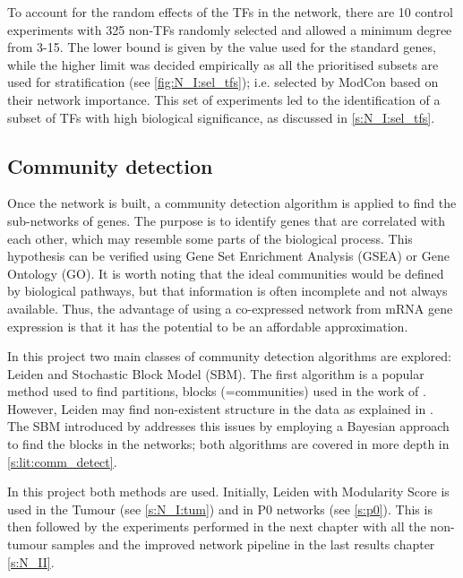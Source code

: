 To account for the random effects of the TFs in the network, there are 10 control experiments with 325 non-TFs randomly selected and allowed a minimum degree from 3-15. The lower bound is given by the value used for the standard genes, while the higher limit was decided empirically as all the prioritised subsets are used for stratification (see \cref{fig:N_I:sel_tfs}); i.e. selected by ModCon based on their network importance. This set of experiments led to the identification of a subset of TFs with high biological significance, as discussed in \cref{s:N_I:sel_tfs}.


\subsection{Community detection} \label{s:N_I:methods_comm_detection}

Once the network is built, a community detection algorithm is applied to find the sub-networks of genes. The purpose is to identify genes that are correlated with each other, which may resemble some parts of the biological process. This hypothesis can be verified using Gene Set Enrichment Analysis (GSEA) or Gene Ontology (GO). It is worth noting that the ideal communities would be defined by biological pathways, but that information is often incomplete and not always available. Thus, the advantage of using a co-expressed network from mRNA gene expression is that it has the potential to be an affordable approximation.

In this project two main classes of community detection algorithms are explored: Leiden and Stochastic Block Model (SBM). The first algorithm is a popular method used to find partitions, blocks (=communities) used in the work of \citet{Care2019-ij}. However, Leiden may find non-existent structure in the data as explained in \citet{Peixoto2021-jx}. The SBM introduced by \citet{Peixoto2019-fg} addresses this issues by employing a Bayesian approach to find the blocks in the networks; both algorithms are covered in more depth in \cref{s:lit:comm_detect}.

In this project both methods are used. Initially, Leiden with Modularity Score is used in the Tumour (see \cref{s:N_I:tum}) and in P0 networks (see \cref{s:p0}). This is then followed by the experiments performed in the next chapter with all the non-tumour samples and the improved network pipeline in the last results chapter \cref{s:N_II}.

